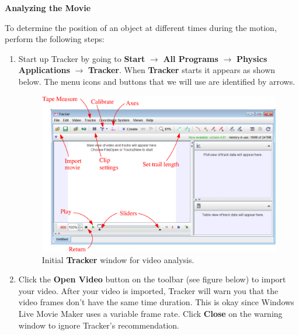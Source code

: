 \textbf{Analyzing the Movie} 

To determine the position of an object at different times during the
motion, perform the following steps:

\begin{enumerate}

\item Start up Tracker by going to {\bf Start} $\rightarrow$ {\bf All Programs} $\rightarrow$ 
{\bf Physics Applications} $\rightarrow$ {\bf Tracker}. 
When {\bf Tracker} starts it appears as shown below. The menu icons and buttons that we will use are identified by arrows.
\begin{figure}[hbt]
\begin{center}
\includegraphics[width=5.5in]{appendices/video_analysis_tracker/video_analysis_tracker_fig1d.eps}
\caption{Initial {\bf Tracker} window for video analysis.}
\end{center}
\end{figure}

\item Click the {\bf Open Video} button on the toolbar (see figure below) to import your video. 
After your video is imported, Tracker will warn you that the video frames don't have the same time duration. 
This is okay since Windows Live Movie Maker uses a variable frame rate. 
Click {\bf Close} on the warning window to ignore Tracker's recommendation.


\end{enumerate}
